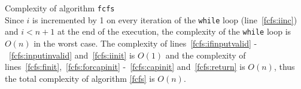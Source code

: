 \begin{sepproof}{Complexity of algorithm \texttt{fcfs}} \ \\
  Since $i$ is incremented by 1 on every iteration of the \texttt{while} loop (line~\ref{fcfs:iinc}) and $i < n+1$ at the end
  of the execution, the complexity of the \texttt{while} loop is $O\left(n\right)$ in the worst case. The complexity of
  lines~\ref{fcfs:ifinputvalid} -~\ref{fcfs:inputinvalid} and~\ref{fcfs:iinit} is $O\left(1\right)$ and the complexity of
  lines~\ref{fcfs:finit},~\ref{fcfs:forcapinit} -~\ref{fcfs:capinit} and~\ref{fcfs:return} is $O\left(n\right)$, thus the
  total complexity of algorithm \ref{fcfs} is $O\left(n\right)$.
\end{sepproof}
